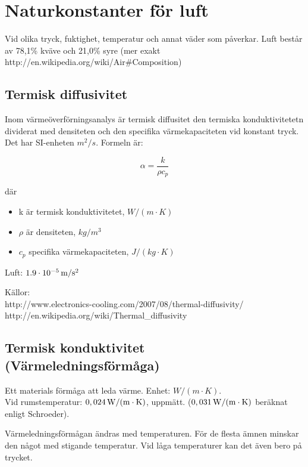 \section{Naturkonstanter för luft}

Vid olika tryck, fuktighet, temperatur och annat väder som påverkar. Luft består av 78,1\% kväve och 21,0\% syre (mer exakt http://en.wikipedia.org/wiki/Air\#Composition)


\subsection{Termisk diffusivitet} %
Inom värmeöverförningsanalys är termisk diffusitet den termiska konduktivitetetn dividerat med densiteten och den specifika värmekapaciteten vid konstant tryck. Det har SI-enheten $m^2/s$. Formeln är:

\begin{equation}
\alpha=\frac{k}{\rho c_p}
\end{equation}

där 
\begin{itemize}
   \item[] k är termisk konduktivitetet, $\unit{W/(m\cdot K)}$
   \item[] $\rho$ är densiteten, $\unit{kg/m^3}$
   \item[] $c_p$ specifika värmekapaciteten, $\unit{J/(kg\cdot K)}$
\end{itemize}

Luft: $\unit[1.9\cdot10^{-5}]{m/s^2}$

Källor:\\
http://www.electronics-cooling.com/2007/08/thermal-diffusivity/\\
http://en.wikipedia.org/wiki/Thermal\_diffusivity\\


\subsection{Termisk konduktivitet (Värmeledningsförmåga)} %
Ett materials förmåga att leda värme. Enhet: $W/(m\cdot K)$.\\
Vid rumstemperatur: $\unit[0,024]{W/(m\cdot K)}$, uppmätt. ($\unit[0,031]{W/(m\cdot K)}$ beräknat enligt Schroeder).

Värmeledningsförmågan ändras med temperaturen. För de flesta ämnen minskar den något med stigande temperatur. Vid låga temperaturer kan det även bero på trycket.

